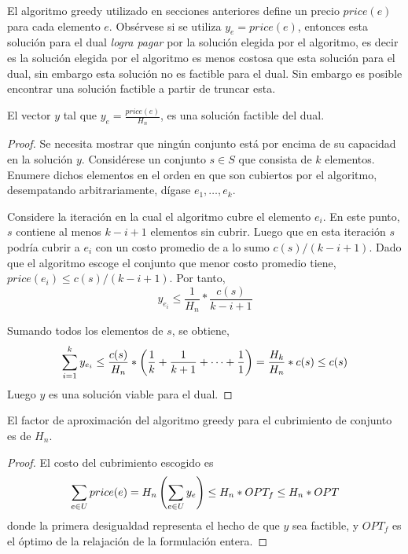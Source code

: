 \documentclass[../np-approximations.tex]{subfiles}
\begin{document}
El algoritmo greedy utilizado en secciones anteriores define un precio $price(e)$ para cada elemento $e$. Obsérvese si se utiliza $y_e = price(e)$, entonces esta solución para el dual \emph{logra pagar} por la solución elegida por el algoritmo, es decir es la solución elegida por el algoritmo es menos costosa que esta solución para el dual, sin embargo esta solución no es factible para el dual. Sin embargo es posible encontrar una solución factible a partir de truncar esta.

\begin{lemma}
	El vector $y$ tal que $y_e = \frac{price(e)}{H_n}$, es una solución factible del dual.
\end{lemma}

\begin{proof}
	Se necesita mostrar que ningún conjunto está por encima de su capacidad en la solución $y$. Considérese un conjunto $s \in S$ que consista de $k$ elementos. Enumere dichos elementos en el orden en que son cubiertos por el algoritmo, desempatando arbitrariamente, dígase $e_1,\dots,e_k$.
														
	Considere la iteración en la cual el algoritmo cubre el elemento $e_i$. En este punto, $s$ contiene al menos $k-i+1$ elementos sin cubrir. Luego que en esta iteración $s$ podría cubrir a $e_i$ con un costo promedio de a lo sumo $c(s)/(k-i+1)$. Dado que el algoritmo escoge el conjunto que menor costo promedio tiene, $price(e_i)\le c(s)/(k-i+1)$. Por tanto,
	\begin{equation*}
		y_{e_i} \le \frac{1}{H_n}*\frac{c(s)}{k-i+1}
	\end{equation*}
													
	Sumando todos los elementos de $s$, se obtiene,
	\begin{equation*}
		\sum_{i=1}^k y_{e_i} \le \frac{c(s)}{H_n}*
		\left( \frac{1}{k} + \frac{1}{k+1}+\dots+\frac{1}{1} \right)=
		\frac{H_k}{H_n}*c(s) \le c(s)
	\end{equation*}
	Luego $y$ es una solución viable para el dual.
														
\end{proof}

\begin{theorem}
	El factor de aproximación del algoritmo greedy para el cubrimiento de conjunto es de $H_n$.
\end{theorem}

\begin{proof}
	El costo del cubrimiento escogido es
	\begin{equation*}
		\sum_{e\in U} price(e) = H_n\left( \sum_{e\in U}y_e \right)
		\le H_n*OPT_f\le H_n*OPT
	\end{equation*}
	donde la primera desigualdad representa el hecho de que $y$ sea factible, y $OPT_f$ es el óptimo de la relajación de la formulación entera.
												
\end{proof}
\end{document}
